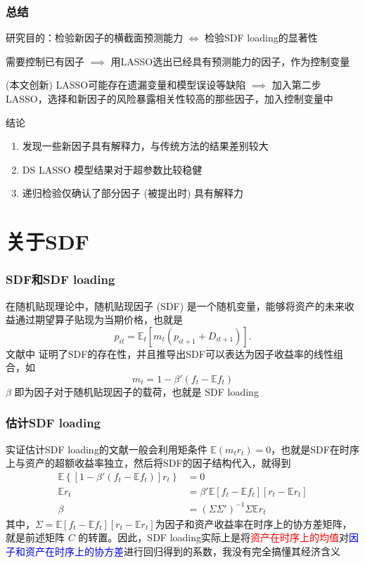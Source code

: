 \documentclass[
  UTF8,
  xcolor={dvipsnames,rgb},
  hyperref={colorlinks, citecolor=orange, linkcolor=black},
  aspectratio=169
  ]{beamer}
\begin{document}
\begin{frame}
    \frametitle{总结}

    \begin{wideitemize}
        \item 研究目的：检验新因子的横截面预测能力 \(\iff\) 检验SDF loading的显著性
        \item 需要控制已有因子 \(\implies\) 用LASSO选出已经具有预测能力的因子，作为控制变量
        \item (本文创新) LASSO可能存在遗漏变量和模型误设等缺陷 \(\implies\) 加入第二步LASSO，选择和新因子的风险暴露相关性较高的那些因子，加入控制变量中
        \item 结论 \begin{enumerate}
            \item 发现一些新因子具有解释力，与传统方法的结果差别较大
            \item DS LASSO 模型结果对于超参数比较稳健
            \item 递归检验仅确认了部分因子 (被提出时) 具有解释力
        \end{enumerate}
    \end{wideitemize}
\end{frame}

\appendix

\begin{frame}[allowframebreaks]
  \printbibliography
\end{frame}

\section{关于SDF}

\begin{frame}[label=appendix1]
    \frametitle{SDF和SDF loading}
    在随机贴现理论中，随机贴现因子 (SDF) 是一个随机变量，能够将资产的未来收益通过期望算子贴现为当期价格，也就是
    \[p_{it} = \mathbb{E}_t [m_t(p_{it+1}+D_{it+1})] .\]
    文献中 \parencite{Cochrane2009} 证明了SDF的存在性，并且推导出SDF可以表达为因子收益率的线性组合，如
    \[m_t=1-\beta'(f_t-\mathbb{E}f_t)\]
    \(\beta\) 即为因子对于随机贴现因子的载荷，也就是 SDF loading
\end{frame}

\begin{frame}
    \frametitle{估计SDF loading}
    实证估计SDF loading的文献一般会利用矩条件 \(\mathbb{E}(m_t r_t)=0\)，也就是SDF在时序上与资产的超额收益率独立，然后将SDF的因子结构代入，就得到
    \begin{align*}
        \mathbb{E} \left\{[1-\beta'(f_t-\mathbb{E}f_t)]r_t\right\}&=0 \\
        \mathbb{E}r_t &= \beta' \mathbb{E}[f_t-\mathbb{E}f_t][r_t-\mathbb{E}r_t] \\
        \beta &= (\Sigma \Sigma')^{-1} \Sigma \mathbb{E}r_t
    \end{align*}
    其中，\(\Sigma=\mathbb{E}[f_t-\mathbb{E}f_t][r_t-\mathbb{E}r_t]\)为因子和资产收益率在时序上的协方差矩阵，就是前述矩阵 \(C\) 的转置。因此，SDF loading实际上是将\textcolor{red}{资产在时序上的均值}对\textcolor{blue}{因子和资产在时序上的协方差}进行回归得到的系数，我没有完全搞懂其经济含义
    \hyperlink{main}{}
\end{frame}
\end{document}
